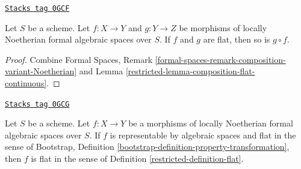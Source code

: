 \begin{lemma}
\label{restricted-lemma-composition-flat}
\href{https://stacks.math.columbia.edu/tag/0GCF}{\texttt{Stacks tag 0GCF}}

Let $S$ be a scheme. Let $f : X \to Y$ and $g : Y \to Z$
be morphisms of locally Noetherian formal algebraic spaces over $S$.
If $f$ and $g$ are flat, then so is $g \circ f$.
\end{lemma}

\begin{proof}

Combine Formal Spaces, Remark
\ref{formal-spaces-remark-composition-variant-Noetherian}
and Lemma \ref{restricted-lemma-composition-flat-continuous}.
\end{proof}

\begin{lemma}
\label{restricted-lemma-representable-flat}
\href{https://stacks.math.columbia.edu/tag/0GCG}{\texttt{Stacks tag 0GCG}}

Let $S$ be a scheme. Let $f : X \to Y$ be a morphisms of
locally Noetherian formal algebraic spaces over $S$.
If $f$ is representable by algebraic spaces and
flat in the sense of Bootstrap, Definition
\ref{bootstrap-definition-property-transformation},
then $f$ is flat in the sense of Definition \ref{restricted-definition-flat}.
\end{lemma}

